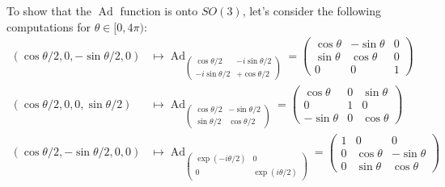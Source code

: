 \documentclass[a4paper, 12pt]{article}
\theoremstyle{Mydefinition}
\theoremstyle{Mytheorem}
\DeclareMathOperator{\Ad}{Ad}
\begin{document}
To show that the $\Ad$ function is onto $\mathit{SO}(3)$, let's consider the following computations for $\theta\in [0,4\pi)$:
\begin{equation*}
\begin{split}
    (\cos\theta/2, 0, -\sin\theta/2, 0)&\mapsto \Ad_{\begin{pmatrix}
        \cos\theta/2 & - i\sin\theta/2 \\
        - i\sin\theta/2 & + \cos\theta/2
    \end{pmatrix}} = \begin{pmatrix}
        \cos\theta & -\sin\theta & 0\\
        \sin\theta & \cos\theta & 0\\
        0 & 0 & 1
    \end{pmatrix}\\
    (\cos\theta/2, 0, 0, \sin\theta/2)&\mapsto \Ad_{\begin{pmatrix}
        \cos\theta/2 & - \sin\theta/2 \\
        \sin\theta/2 & \cos\theta/2
    \end{pmatrix}} = \begin{pmatrix}
        \cos\theta & 0 & \sin\theta\\
        0 & 1 & 0\\
        -\sin\theta & 0 & \cos\theta
    \end{pmatrix}\\
    (\cos\theta/2, -\sin\theta/2, 0, 0)&\mapsto \Ad_{\begin{pmatrix}
        \exp(-i\theta/2) & 0 \\
        0 & \exp(i\theta/2)
    \end{pmatrix}} = \begin{pmatrix}
        1 & 0 & 0\\
        0 & \cos\theta & -\sin\theta\\
        0 & \sin\theta & \cos\theta
    \end{pmatrix}
\end{split}
\end{equation*}
\end{document}
